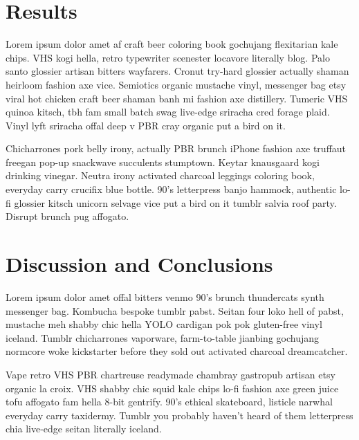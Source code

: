 \documentclass[twoside]{article}
\begin{document}
\begin{multicols}{2}
\section{Results}

Lorem ipsum dolor amet af craft beer coloring book gochujang flexitarian kale chips. VHS kogi hella, retro typewriter scenester locavore literally blog. Palo santo glossier artisan bitters wayfarers. Cronut try-hard glossier actually shaman heirloom fashion axe vice. Semiotics organic mustache vinyl, messenger bag etsy viral hot chicken craft beer shaman banh mi fashion axe distillery. Tumeric VHS quinoa kitsch, tbh fam small batch swag live-edge sriracha cred forage plaid. Vinyl lyft sriracha offal deep v PBR cray organic put a bird on it.

Chicharrones pork belly irony, actually PBR brunch iPhone fashion axe truffaut freegan pop-up snackwave succulents stumptown. Keytar knausgaard kogi drinking vinegar. Neutra irony activated charcoal leggings coloring book, everyday carry crucifix blue bottle. 90's letterpress banjo hammock, authentic lo-fi glossier kitsch unicorn selvage vice put a bird on it tumblr salvia roof party. Disrupt brunch pug affogato.

\section{Discussion and Conclusions}

Lorem ipsum dolor amet offal bitters venmo 90's brunch thundercats synth messenger bag. Kombucha bespoke tumblr pabst. Seitan four loko hell of pabst, mustache meh shabby chic hella YOLO cardigan pok pok gluten-free vinyl iceland. Tumblr chicharrones vaporware, farm-to-table jianbing gochujang normcore woke kickstarter before they sold out activated charcoal dreamcatcher.

Vape retro VHS PBR chartreuse readymade chambray gastropub artisan etsy organic la croix. VHS shabby chic squid kale chips lo-fi fashion axe green juice tofu affogato fam hella 8-bit gentrify. 90's ethical skateboard, listicle narwhal everyday carry taxidermy. Tumblr you probably haven't heard of them letterpress chia live-edge seitan literally iceland.


\begin{thebibliography}{99} %


\end{thebibliography}
\end{multicols}
\end{document}
